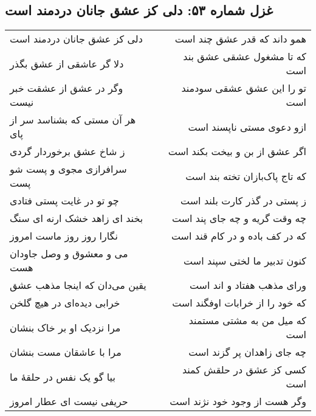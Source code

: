 \begin{center}
\section*{غزل شماره ۵۳: دلی کز عشق جانان دردمند است}
\label{sec:053}
\begin{longtable}{l p{0.5cm} r}
دلی کز عشق جانان دردمند است
&&
همو داند که قدر عشق چند است
\\
دلا گر عاشقی از عشق بگذر
&&
که تا مشغول عشقی عشق بند است
\\
وگر در عشق از عشقت خبر نیست
&&
تو را این عشق عشقی سودمند است
\\
هر آن مستی که بشناسد سر از پای
&&
ازو دعوی مستی ناپسند است
\\
ز شاخ عشق برخوردار گردی
&&
اگر عشق از بن و بیخت بکند است
\\
سرافرازی مجوی و پست شو پست
&&
که تاج پاک‌بازان تخته بند است
\\
چو تو در غایت پستی فتادی
&&
ز پستی در گذر کارت بلند است
\\
بخند ای زاهد خشک ارنه ای سنگ
&&
چه وقت گریه و چه جای پند است
\\
نگارا روز روز ماست امروز
&&
که در کف باده و در کام قند است
\\
می و معشوق و وصل جاودان هست
&&
کنون تدبیر ما لختی سپند است
\\
یقین می‌دان که اینجا مذهب عشق
&&
ورای مذهب هفتاد و اند است
\\
خرابی دیده‌ای در هیچ گلخن
&&
که خود را از خرابات اوفگند است
\\
مرا نزدیک او بر خاک بنشان
&&
که میل من به مشتی مستمند است
\\
مرا با عاشقان مست بنشان
&&
چه جای زاهدان پر گزند است
\\
بیا گو یک نفس در حلقهٔ ما
&&
کسی کز عشق در حلقش کمند است
\\
حریفی نیست ای عطار امروز
&&
وگر هست از وجود خود نژند است
\\
\end{longtable}
\end{center}
